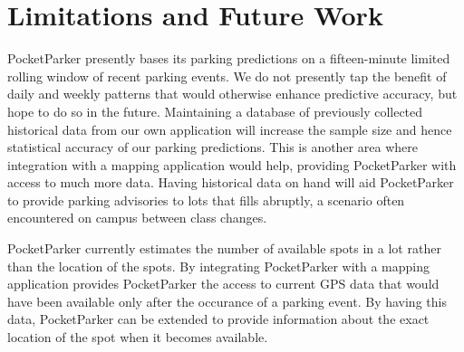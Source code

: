 \section{Limitations and Future Work}
\label{sec-future}
\begin{comment}
The pocketsourcing approach taken by PocketParker makes it easy to integrate
into existing mapping applications, such as Google Maps. Doing so would
benefit PocketParker in two ways. First, Google Maps and other navigation
tools are in extremely wide deployment, with the Play Store estimating
more than 500 millions of installs for Google Maps. If we can increase the monitored
fraction significantly, much of the work PocketParker does to perform
estimation and work around low monitored fractions will be unnecessary.
  Removed this paragraph to save space
PocketParker will also benefit from the increased amount of location context
available through integration into mapping software. We imagine a ``Help Me
Park'' button which engages PocketParker. This small piece of natural user
input allows PocketParker to identify \textit{explicit} searches and use them
to build up a lot desirability model with requiring annotations. However,
once PocketParker begins guiding users to available parking spaces we will
have to incorporate the effects of our guidance on natural user behavior.
However, we believe that many users will only query PocketParker when parking
in unfamiliar locations, while still providing data about lots they use
regularly and know well.
\end{comment}

PocketParker presently bases its parking predictions on a fifteen-minute
limited rolling window of recent parking events. We do not presently tap the
benefit of daily and weekly patterns that would otherwise enhance predictive
accuracy, but hope to do so in the future. Maintaining a database of
previously collected historical data from our own application will increase
the sample size and hence statistical accuracy of our parking predictions.
This is another area where integration with a mapping application would help,
providing PocketParker with access to much more data. Having historical data on
hand will aid PocketParker to provide parking advisories to lots that fills 
abruptly, a scenario often encountered on campus between class changes.

PocketParker currently estimates the number of available spots in a lot rather
than the location of the spots. By integrating PocketParker with a mapping
application provides PocketParker the access to current GPS data that would
have been available only after the occurance of a parking event. By having this
data, PocketParker can be extended to provide information about the exact
location of the spot when it becomes available.

